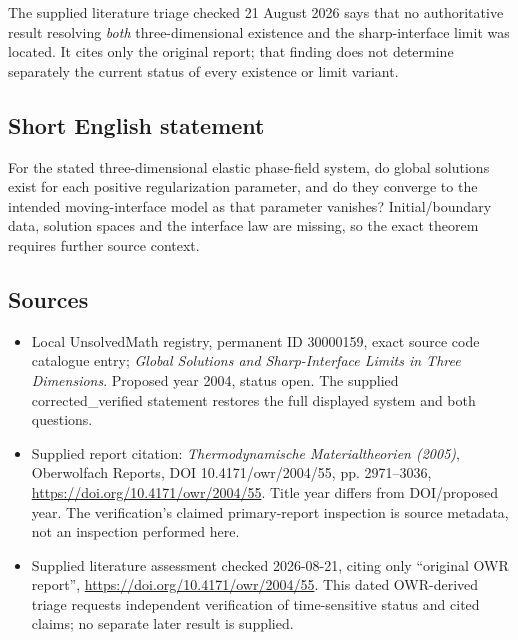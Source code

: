 \documentclass[11pt]{article}
\begin{document}
The supplied literature triage checked 21 August 2026 says that no authoritative result resolving \emph{both} three-dimensional existence and the sharp-interface limit was located. It cites only the original report; that finding does not determine separately the current status of every existence or limit variant.
\subsection{Short English statement}
For the stated three-dimensional elastic phase-field system, do global solutions exist for each positive regularization parameter, and do they converge to the intended moving-interface model as that parameter vanishes? Initial/boundary data, solution spaces and the interface law are missing, so the exact theorem requires further source context.
\subsection{Sources}
\begin{itemize}
\item Local UnsolvedMath registry, permanent ID 30000159, exact source code catalogue entry; \emph{Global Solutions and Sharp-Interface Limits in Three Dimensions}. Proposed year 2004, status open. The supplied corrected\_verified statement restores the full displayed system and both questions.
\item Supplied report citation: \emph{Thermodynamische Materialtheorien (2005)}, Oberwolfach Reports, DOI 10.4171/owr/2004/55, pp. 2971--3036, \url{https://doi.org/10.4171/owr/2004/55}. Title year differs from DOI/proposed year. The verification's claimed primary-report inspection is source metadata, not an inspection performed here.
\item Supplied literature assessment checked 2026-08-21, citing only ``original OWR report'', \url{https://doi.org/10.4171/owr/2004/55}. This dated OWR-derived triage requests independent verification of time-sensitive status and cited claims; no separate later result is supplied.
\end{itemize}
\end{document}
